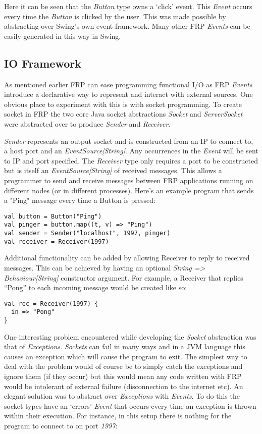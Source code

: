 \documentclass[12pt]{article}
\begin{document}
      Here it can be seen that the \emph{Button} type owns a `click' event. This \emph{Event} occurs every time the 
      \emph{Button} is clicked by the user. This was made possible by abstracting over Swing's own event framework. Many other 
      FRP \emph{Events} can be easily generated in this way in Swing.
    
    \subsection{IO Framework}
    
    As mentioned earlier FRP can ease programming functional I/O as FRP \emph{Events} introduce a declarative way to represent 
    and interact with external sources. One obvious place to experiment with this is with socket programming. To create socket 
    in FRP the two core Java socket abstractions \emph{Socket} and \emph{ServerSocket} were abstracted over to produce
    \emph{Sender} and \emph{Receiver}. 

    \emph{Sender} represents an output socket and is constructed from an IP to connect to, a host port and an 
    \emph{EventSource[String]}. Any occurrences in the \emph{Event} will be sent to IP and port specified. The \emph{Receiver} 
    type only requires a port to be constructed but is itself an \emph{EventSource[String]} of received messages. This allows 
    a programmer to send and receive messages between FRP applications running on different nodes (or in different processes).
    Here's an example program that sends a "Ping" message every time a Button is pressed:

\begin{verbatim}
val button = Button("Ping")
val pinger = button.map((t, v) => "Ping")
val sender = Sender("localhost", 1997, pinger)
val receiver = Receiver(1997)
\end{verbatim}
    
    Additional functionality can be added by allowing Receiver to reply to received messages. This can be achieved by
    having an optional \emph{String => Behaviour[String]} constructor argument. For example, a Receiver that replies
    ``Pong'' to each incoming message would be created like so:
 
\begin{verbatim}
val rec = Receiver(1997) {
  in => "Pong"
}
\end{verbatim}    

    One interesting problem encountered while developing the \emph{Socket} abstraction was that of \emph{Exceptions}. 
    \emph{Sockets} can fail in many ways and in a JVM language this causes an exception which will cause the program to exit. 
    The simplest way to deal with the problem would of course be to simply catch the exceptions and ignore them (if they 
    occur) but this would mean any code written with FRP would be intolerant of external failure (disconnection to the 
    internet etc). An elegant solution was to abstract over \emph{Exceptions} with \emph{Events}. To do this the socket types 
    have an `errors' \emph{Event} that occurs every time an exception is thrown within their execution. For instance, in this 
    setup there is nothing for the program to connect to on port \emph{1997}:
\end{document}

